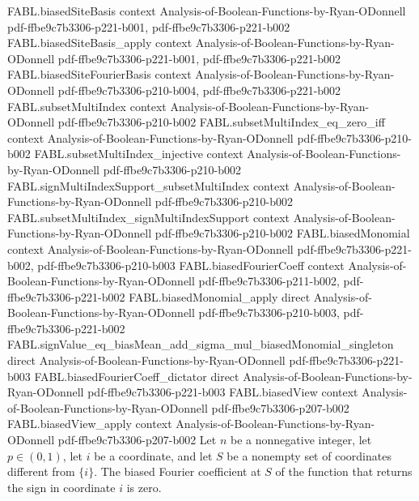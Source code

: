 \begin{theorem}
\proofstep
  {FABL.biasedSiteBasis}
  {context}
  {Analysis-of-Boolean-Functions-by-Ryan-ODonnell}
  {pdf-ffbe9c7b3306-p221-b001,
    pdf-ffbe9c7b3306-p221-b002}
\proofstep
  {FABL.biasedSiteBasis_apply}
  {context}
  {Analysis-of-Boolean-Functions-by-Ryan-ODonnell}
  {pdf-ffbe9c7b3306-p221-b001,
    pdf-ffbe9c7b3306-p221-b002}
\proofstep
  {FABL.biasedSiteFourierBasis}
  {context}
  {Analysis-of-Boolean-Functions-by-Ryan-ODonnell}
  {pdf-ffbe9c7b3306-p210-b004,
    pdf-ffbe9c7b3306-p221-b002}
\proofstep
  {FABL.subsetMultiIndex}
  {context}
  {Analysis-of-Boolean-Functions-by-Ryan-ODonnell}
  {pdf-ffbe9c7b3306-p210-b002}
\proofstep
  {FABL.subsetMultiIndex_eq_zero_iff}
  {context}
  {Analysis-of-Boolean-Functions-by-Ryan-ODonnell}
  {pdf-ffbe9c7b3306-p210-b002}
\proofstep
  {FABL.subsetMultiIndex_injective}
  {context}
  {Analysis-of-Boolean-Functions-by-Ryan-ODonnell}
  {pdf-ffbe9c7b3306-p210-b002}
\proofstep
  {FABL.signMultiIndexSupport_subsetMultiIndex}
  {context}
  {Analysis-of-Boolean-Functions-by-Ryan-ODonnell}
  {pdf-ffbe9c7b3306-p210-b002}
\proofstep
  {FABL.subsetMultiIndex_signMultiIndexSupport}
  {context}
  {Analysis-of-Boolean-Functions-by-Ryan-ODonnell}
  {pdf-ffbe9c7b3306-p210-b002}
\proofstep
  {FABL.biasedMonomial}
  {context}
  {Analysis-of-Boolean-Functions-by-Ryan-ODonnell}
  {pdf-ffbe9c7b3306-p221-b002,
    pdf-ffbe9c7b3306-p210-b003}
\proofstep
  {FABL.biasedFourierCoeff}
  {context}
  {Analysis-of-Boolean-Functions-by-Ryan-ODonnell}
  {pdf-ffbe9c7b3306-p211-b002,
    pdf-ffbe9c7b3306-p221-b002}
\proofstep
  {FABL.biasedMonomial_apply}
  {direct}
  {Analysis-of-Boolean-Functions-by-Ryan-ODonnell}
  {pdf-ffbe9c7b3306-p210-b003,
    pdf-ffbe9c7b3306-p221-b002}
\proofstep
  {FABL.signValue_eq_biasMean_add_sigma_mul_biasedMonomial_singleton}
  {direct}
  {Analysis-of-Boolean-Functions-by-Ryan-ODonnell}
  {pdf-ffbe9c7b3306-p221-b003}
\proofstep
  {FABL.biasedFourierCoeff_dictator}
  {direct}
  {Analysis-of-Boolean-Functions-by-Ryan-ODonnell}
  {pdf-ffbe9c7b3306-p221-b003}
\proofstep
  {FABL.biasedView}
  {context}
  {Analysis-of-Boolean-Functions-by-Ryan-ODonnell}
  {pdf-ffbe9c7b3306-p207-b002}
\proofstep
  {FABL.biasedView_apply}
  {context}
  {Analysis-of-Boolean-Functions-by-Ryan-ODonnell}
  {pdf-ffbe9c7b3306-p207-b002}
Let $n$ be a nonnegative integer, let $p\in(0,1)$, let $i$ be a coordinate, and let $S$
be a nonempty set of coordinates different from $\{i\}$. The biased Fourier coefficient
at $S$ of the function that returns the sign in coordinate $i$ is zero.
\end{theorem}

